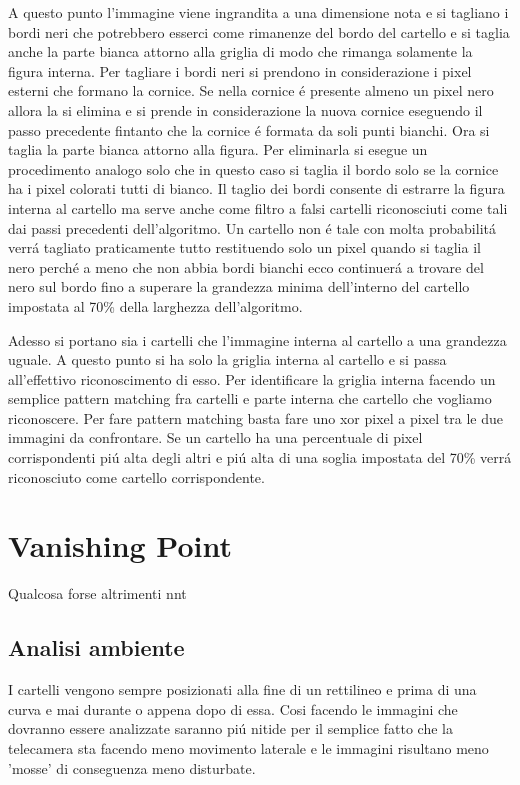 		A questo punto l'immagine viene ingrandita a una dimensione nota e si tagliano i bordi neri che potrebbero esserci come rimanenze del bordo del cartello e si taglia anche la parte bianca attorno alla griglia di modo che rimanga solamente la figura interna. Per tagliare i bordi neri si prendono in considerazione i pixel esterni che formano la cornice. Se nella cornice \'e presente almeno un pixel nero allora la si elimina e si prende in considerazione la nuova cornice eseguendo il passo precedente fintanto che la cornice \'e formata da soli punti bianchi. Ora si taglia la parte bianca attorno alla figura. Per eliminarla si esegue un procedimento analogo solo che in questo caso si taglia il bordo solo se la cornice ha i pixel colorati tutti di bianco. Il taglio dei bordi consente di estrarre la figura interna al cartello ma serve anche come filtro a falsi cartelli riconosciuti come tali dai passi precedenti dell'algoritmo. Un cartello non \'e tale con molta probabilit\'a verr\'a tagliato praticamente tutto restituendo solo un pixel quando si taglia il nero perch\'e a meno che non abbia bordi bianchi ecco continuer\'a a trovare del nero sul bordo fino a superare la grandezza minima dell'interno del cartello impostata al 70\% della larghezza dell'algoritmo.
		
		Adesso si portano sia i cartelli che l'immagine interna al cartello a una grandezza uguale.
		A questo punto si ha solo la griglia interna al cartello e si passa all'effettivo riconoscimento di esso. Per identificare la griglia interna facendo un semplice pattern matching fra cartelli e parte interna che cartello che vogliamo riconoscere. Per fare pattern matching basta fare uno xor pixel a pixel tra le due immagini da confrontare. Se un cartello ha una percentuale di pixel corrispondenti pi\'u alta degli altri e pi\'u alta di una soglia impostata del 70\% verr\'a riconosciuto come cartello corrispondente.
		

\section{Vanishing Point}

	Qualcosa forse altrimenti nnt

	\subsection{Analisi ambiente}

		I cartelli vengono sempre posizionati alla fine di un rettilineo e prima di una curva e mai durante o appena dopo di essa. Cosi facendo le immagini che dovranno essere analizzate saranno pi\'u nitide per il semplice fatto che la telecamera sta facendo meno movimento laterale e le immagini risultano meno 'mosse' di conseguenza meno disturbate.

